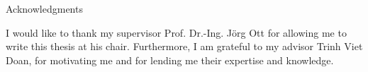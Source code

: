 \thispagestyle{empty}

\vspace*{20mm}

\begin{center}
{ Acknowledgments}
\end{center}

\vspace{10mm}

I would like to thank my supervisor Prof. Dr.-Ing. Jörg Ott for allowing me to write this thesis at his chair. Furthermore, I am grateful to my advisor Trinh Viet Doan, for motivating me and for lending me their expertise and knowledge.

\vspace{10mm}

\cleardoublepage{}